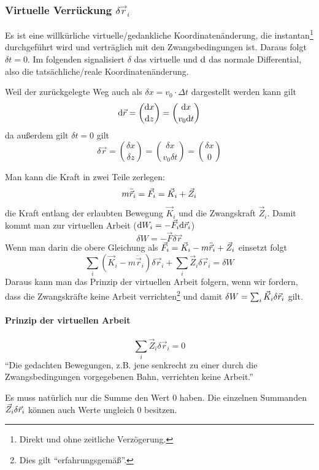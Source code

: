 
\subsubsection{Virtuelle Verrückung $\delta \vec{r}_i$} Es ist eine willkürliche virtuelle/gedankliche Koordinatenänderung, die instantan\footnote{Direkt und ohne zeitliche Verzögerung.} durchgeführt wird und verträglich mit den Zwangsbedingungen ist. Daraus folgt $\delta t = 0$. Im folgenden signalisiert $\delta$ das virtuelle und $\mathrm d$ das normale Differential, also die tatsächliche/reale Koordinatenänderung.

\begin{beispiel*}
Weil der zurückgelegte Weg auch als $\delta x = v_0 \cdot \Delta t$ dargestellt werden kann gilt
$$\mathrm d \vec{r} = \binom{\mathrm d x}{\mathrm d z} = \binom{\mathrm d x}{ v_0 \mathrm d t}$$
da außerdem gilt $\delta t = 0$ gilt
$$\delta \vec{r} = \binom{\delta x}{\delta z} = \binom{\delta x}{v_0 \delta t} = \binom{\delta x}{0}$$
\end{beispiel*}
Man kann die Kraft in zwei Teile zerlegen:
$$m \ddot{\vec{r}}_i = \vec{F}_i = \vec{K}_i + \vec{Z}_i$$
die Kraft entlang der erlaubten Bewegung $\vec{K}_i$ und die Zwangskraft $\vec{Z}_i$. Damit kommt man zur virtuellen Arbeit ($\mathrm d W_i = - \vec{F}_i \mathrm d \vec{r}_i$)
$$\delta W = - \vec{F} \delta \vec{r}$$
Wenn man darin die obere Gleichung als $\vec{F}_i = \vec{K}_i - m \ddot{\vec{r}}_i + \vec{Z}_i$ einsetzt folgt
$$\sum_i (\vec{K}_i - m \ddot{\vec{r}}_i) \delta \vec{r}_i + \sum_i \vec{Z}_i \delta \vec{r}_i = \delta W$$
Daraus kann man das Prinzip der virtuellen Arbeit folgern, wenn wir fordern, dass die Zwangskräfte keine Arbeit verrichten\footnote{Dies gilt "`erfahrungsgemäß"'.} und damit $\delta W = \sum_i \vec{K}_i \delta \vec{r}_i$ gilt.

\paragraph{Prinzip der virtuellen Arbeit}
$$\sum_i \vec{Z}_i \delta \vec{r}_i = 0$$
"`Die gedachten Bewegungen, z.B. jene senkrecht zu einer durch die Zwangsbedingungen vorgegebenen Bahn, verrichten keine Arbeit."'

\begin{bemerkung*}
	Es muss natürlich nur die Summe den Wert 0 haben. Die einzelnen Summanden $\vec{Z}_i \delta \vec{r}_i$ können auch Werte ungleich 0 besitzen.
\end{bemerkung*}

